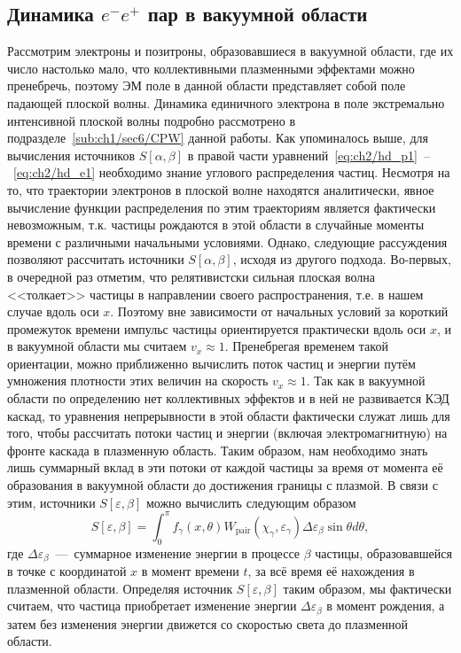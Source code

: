 \subsection{Динамика $e^-e^+$ пар в вакуумной области}
Рассмотрим электроны и позитроны, образовавшиеся в вакуумной области, где их число настолько мало, что коллективными плазменными эффектами можно пренебречь, поэтому ЭМ поле в данной области представляет собой поле падающей плоской волны. 
Динамика единичного электрона в поле экстремально интенсивной плоской волны подробно рассмотрено в подразделе~\ref{sub:ch1/sec6/CPW} данной работы.
Как упоминалось выше, для вычисления источников $S[\alpha, \beta]$ в правой части уравнений~\eqref{eq:ch2/hd_p1}~--~\eqref{eq:ch2/hd_e1} необходимо знание углового распределения частиц.
Несмотря на то, что траектории электронов в плоской волне находятся аналитически, явное вычисление функции распределения по этим траекториям является фактически невозможным, т.к. частицы рождаются в этой области в случайные моменты времени с различными начальными условиями.
Однако, следующие рассуждения позволяют рассчитать источники $S[\alpha, \beta]$, исходя из другого подхода.
Во-первых, в очередной раз отметим, что релятивистски сильная плоская волна <<толкает>> частицы в направлении своего распространения, т.е. в нашем случае вдоль оси $x$.
Поэтому вне зависимости от начальных условий за короткий промежуток времени импульс частицы ориентируется практически вдоль оси $x$, и в вакуумной области мы считаем $v_x \approx 1$.
Пренебрегая временем такой ориентации, можно приближенно вычислить поток частиц и энергии путём умножения плотности этих величин на скорость $v_x \approx 1$.
Так как в вакуумной области по определению нет коллективных эффектов и в ней не развивается КЭД каскад, то уравнения непрерывности в этой области фактически служат лишь для того, чтобы рассчитать потоки частиц и энергии (включая электромагнитную) на фронте каскада в плазменную область.
Таким образом, нам необходимо знать лишь суммарный вклад в эти потоки от каждой частицы за время от момента её образования в вакуумной области до достижения границы с плазмой.
В связи с этим, источники $S[\varepsilon,\beta]$ можно вычислить следующим образом
\begin{equation}
    S[\varepsilon,\beta] = \int_0^\pi f_\gamma(x, \theta) W_\mathrm{pair}(\chi_\gamma, \varepsilon_\gamma) \Delta\varepsilon_\beta \sin\theta d\theta ,
\end{equation}
где $\Delta\varepsilon_\beta$~---~суммарное изменение энергии в процессе $\beta$ частицы, образовавшейся в точке с координатой $x$ в момент времени $t$, за всё время её нахождения в плазменной области.
Определяя источник $S[\varepsilon,\beta]$ таким образом, мы фактически считаем, что частица приобретает изменение энергии $\Delta\varepsilon_\beta$ в момент рождения, а затем без изменения энергии движется со скоростью света до плазменной области.

